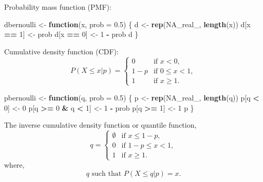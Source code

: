 \documentclass[]{book}
\newenvironment{Shaded}{\begin{snugshade}}{\end{snugshade}}
\newcommand{\ControlFlowTok}[1]{\textcolor[rgb]{0.13,0.29,0.53}{\textbf{#1}}}
\newcommand{\DataTypeTok}[1]{\textcolor[rgb]{0.13,0.29,0.53}{#1}}
\newcommand{\DecValTok}[1]{\textcolor[rgb]{0.00,0.00,0.81}{#1}}
\newcommand{\FloatTok}[1]{\textcolor[rgb]{0.00,0.00,0.81}{#1}}
\newcommand{\KeywordTok}[1]{\textcolor[rgb]{0.13,0.29,0.53}{\textbf{#1}}}
\newcommand{\NormalTok}[1]{#1}
\newcommand{\OperatorTok}[1]{\textcolor[rgb]{0.81,0.36,0.00}{\textbf{#1}}}
\newcommand{\OtherTok}[1]{\textcolor[rgb]{0.56,0.35,0.01}{#1}}
\newcommand{\StringTok}[1]{\textcolor[rgb]{0.31,0.60,0.02}{#1}}
\theoremstyle{definition}
\theoremstyle{definition}
\theoremstyle{definition}
\theoremstyle{remark}
\begin{document}
Probability mass function (PMF):

\begin{Shaded}
\begin{Highlighting}[]
\NormalTok{dbernoulli <-}\StringTok{ }\ControlFlowTok{function}\NormalTok{(x, }\DataTypeTok{prob =} \FloatTok{0.5}\NormalTok{) \{}
\NormalTok{  d <-}\StringTok{ }\KeywordTok{rep}\NormalTok{(}\OtherTok{NA_real_}\NormalTok{, }\KeywordTok{length}\NormalTok{(x))}
\NormalTok{  d[x }\OperatorTok{==}\StringTok{ }\DecValTok{1}\NormalTok{] <-}\StringTok{ }\NormalTok{prob}
\NormalTok{  d[x }\OperatorTok{==}\StringTok{ }\DecValTok{0}\NormalTok{] <-}\StringTok{ }\DecValTok{1} \OperatorTok{-}\StringTok{ }\NormalTok{prob}
\NormalTok{  d}
\NormalTok{\}}
\end{Highlighting}
\end{Shaded}

Cumulative density function (CDF): \[
P(X \leq x|p) = \begin{cases}
0 & \text{if } x < 0 , \\
1 - p & \text{if } 0 \leq x < 1 ,\\
1 & \text{if } x \geq 1 .
\end{cases}
\]

\begin{Shaded}
\begin{Highlighting}[]
\NormalTok{pbernoulli <-}\StringTok{ }\ControlFlowTok{function}\NormalTok{(q, }\DataTypeTok{prob =} \FloatTok{0.5}\NormalTok{) \{}
\NormalTok{  p <-}\StringTok{ }\KeywordTok{rep}\NormalTok{(}\OtherTok{NA_real_}\NormalTok{, }\KeywordTok{length}\NormalTok{(q))}
\NormalTok{  p[q }\OperatorTok{<}\StringTok{ }\DecValTok{0}\NormalTok{] <-}\StringTok{ }\DecValTok{0}
\NormalTok{  p[q }\OperatorTok{>=}\StringTok{ }\DecValTok{0} \OperatorTok{&}\StringTok{ }\NormalTok{q }\OperatorTok{<}\StringTok{ }\DecValTok{1}\NormalTok{] <-}\StringTok{ }\DecValTok{1} \OperatorTok{-}\StringTok{ }\NormalTok{prob}
\NormalTok{  p[q }\OperatorTok{>=}\StringTok{ }\DecValTok{1}\NormalTok{] <-}\StringTok{ }\DecValTok{1}
\NormalTok{  p}
\NormalTok{\}}
\end{Highlighting}
\end{Shaded}

The inverse cumulative density function or quantile function, \[
q =
\begin{cases}
\emptyset & \text{if } x \leq 1 - p, \\
0 & \text{if } 1 - p \leq x < 1 ,\\
1 & \text{if } x \geq 1 .
\end{cases}
\] where, \[
q \text{ such that } P(X \leq q|p) = x.
\]
\end{document}
